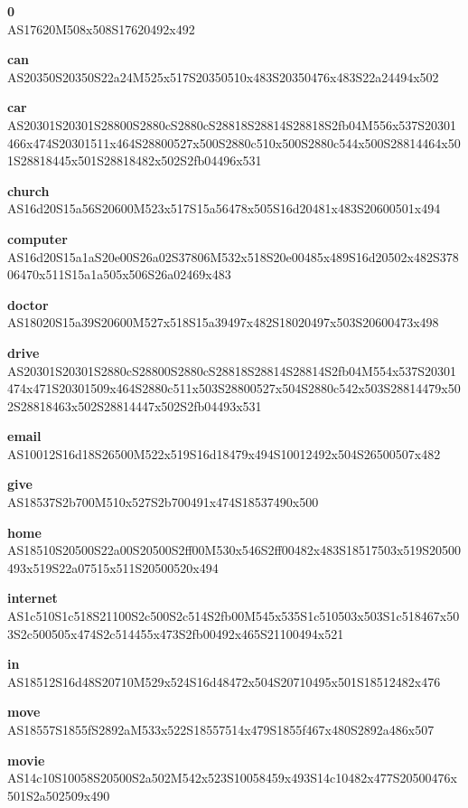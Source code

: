\documentclass{article}
\begin{document}
\begin{glossary}

\textbf{0}\\
AS17620M508x508S17620492x492

\textbf{can}\\
AS20350S20350S22a24M525x517S20350510x483S20350476x483S22a24494x502

\textbf{car}\\
AS20301S20301S28800S2880cS2880cS28818S28814S28818S2fb04M556x537S20301466x474S20301511x464S28800527x500S2880c510x500S2880c544x500S28814464x501S28818445x501S28818482x502S2fb04496x531

\textbf{church}\\
AS16d20S15a56S20600M523x517S15a56478x505S16d20481x483S20600501x494

\textbf{computer}\\
AS16d20S15a1aS20e00S26a02S37806M532x518S20e00485x489S16d20502x482S37806470x511S15a1a505x506S26a02469x483

\textbf{doctor}\\
AS18020S15a39S20600M527x518S15a39497x482S18020497x503S20600473x498

\textbf{drive}\\
AS20301S20301S2880cS28800S2880cS28818S28814S28814S2fb04M554x537S20301474x471S20301509x464S2880c511x503S28800527x504S2880c542x503S28814479x502S28818463x502S28814447x502S2fb04493x531

\textbf{email}\\
AS10012S16d18S26500M522x519S16d18479x494S10012492x504S26500507x482

\textbf{give}\\
AS18537S2b700M510x527S2b700491x474S18537490x500

\textbf{home}\\
AS18510S20500S22a00S20500S2ff00M530x546S2ff00482x483S18517503x519S20500493x519S22a07515x511S20500520x494

\textbf{internet}\\
AS1c510S1c518S21100S2c500S2c514S2fb00M545x535S1c510503x503S1c518467x503S2c500505x474S2c514455x473S2fb00492x465S21100494x521

\textbf{in}\\
AS18512S16d48S20710M529x524S16d48472x504S20710495x501S18512482x476

\textbf{move}\\
AS18557S1855fS2892aM533x522S18557514x479S1855f467x480S2892a486x507

\textbf{movie}\\
AS14c10S10058S20500S2a502M542x523S10058459x493S14c10482x477S20500476x501S2a502509x490


\end{glossary}
\end{document}
